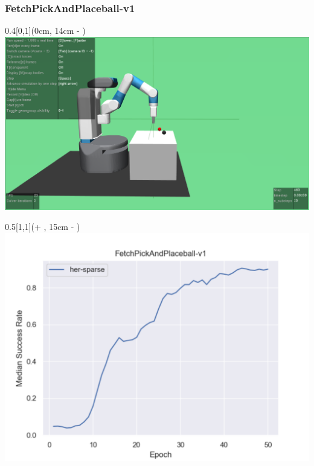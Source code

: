 

\begin{frame}
	\frametitle{FetchPickAndPlaceball-v1}	
	\vspace{1cm}
	
	\begin{textblock*}{0.4\paperwidth}[0,1](0cm, 14cm - \PraesentationSeitenrand)%
		\includegraphics[width=0.4\paperwidth]{./Ressourcen/Figures/FetchPickAndPlaceball-v1.pdf}
	\end{textblock*}
	
	\begin{textblock*}{0.5\paperwidth}[1,1](\textwidth + \PraesentationSeitenrand, 15cm - \PraesentationSeitenrand)%
		\includegraphics[width=0.5\paperwidth]{./Ressourcen/Figures/fig_FetchPickAndPlaceball-v1.pdf}
	\end{textblock*}
	
\end{frame}
\clearpage


